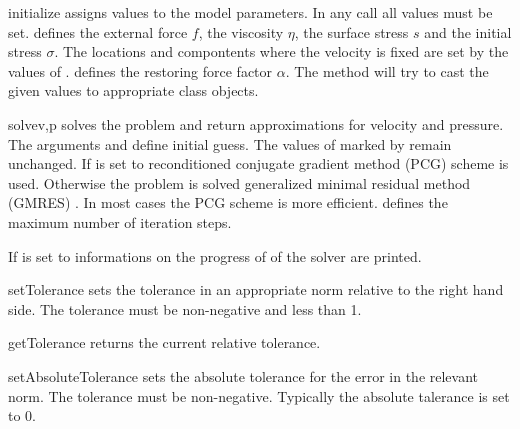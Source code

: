 \begin{methoddesc}[StokesProblemCartesian]{initialize}{}
assigns values to the model parameters. In any call all values must be set.
 defines the external force $f$,  the viscosity $\eta$,
 the surface stress $s$ and  the initial stress $\sigma$.
The locations and compontents where the velocity is fixed are set by 
the values of .  defines the restoring force factor $\alpha$. 
The method will try to cast the given values to appropriate 
\Data class objects.
\end{methoddesc}

\begin{methoddesc}[StokesProblemCartesian]{solve}{v,p
}
solves the problem and return approximations for velocity and pressure. 
The arguments  and  define initial guess. The values of  marked
by  remain unchanged. 
If  is set to \True 
reconditioned conjugate gradient method (PCG)   scheme is used. Otherwise the problem is solved generalized minimal residual method (GMRES) . In most cases 
the PCG scheme is more efficient.
 defines the maximum number of iteration steps. 

If  is set to \True informations on the progress of of the solver are printed.
\end{methoddesc}


\begin{methoddesc}[StokesProblemCartesian]{setTolerance}{}
sets the tolerance in an appropriate norm relative to the right hand side. The tolerance must be non-negative and less than 1.
\end{methoddesc}
\begin{methoddesc}[StokesProblemCartesian]{getTolerance}{}
returns the current relative tolerance.
\end{methoddesc}
\begin{methoddesc}[StokesProblemCartesian]{setAbsoluteTolerance}{}
sets the absolute tolerance for the error in the relevant norm. The tolerance must be non-negative. Typically the
absolute talerance is set to 0.
\end{methoddesc}

